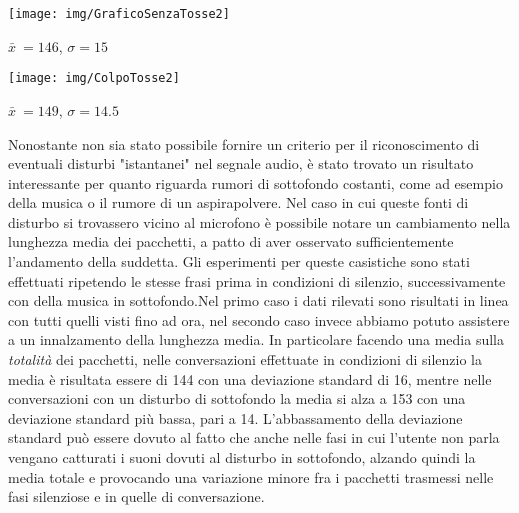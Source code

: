 \begin{minipage}{\linewidth}
\texttt{[image: img/GraficoSenzaTosse2]}
\end{minipage}
\begin{center}
$\bar x\ = 146 $, $\sigma = 15 $
\end{center}


\begin{minipage}{\linewidth}
\texttt{[image: img/ColpoTosse2]}
\end{minipage}
\begin{center}
$\bar x\ = 149 $, $\sigma = 14.5 $
\end{center}

Nonostante non sia stato possibile fornire un criterio per il riconoscimento di eventuali disturbi "istantanei" nel segnale audio, è stato trovato un risultato interessante per quanto riguarda rumori di sottofondo costanti, come ad esempio della musica o il rumore di un aspirapolvere.\newline
Nel caso in cui queste fonti di disturbo si trovassero vicino al microfono è possibile notare un cambiamento nella lunghezza media dei pacchetti, a patto di aver osservato sufficientemente l'andamento della suddetta. Gli esperimenti per queste casistiche sono stati effettuati ripetendo le stesse frasi prima in condizioni di silenzio, successivamente con della musica in sottofondo.\newline Nel primo caso i dati rilevati sono risultati in linea con tutti quelli visti fino ad ora, nel secondo caso invece abbiamo potuto assistere a un innalzamento della lunghezza media. In particolare facendo una media sulla \emph{totalità} dei pacchetti, nelle conversazioni effettuate in condizioni di silenzio la media è risultata essere di 144 con una deviazione standard di 16, mentre nelle conversazioni con un disturbo di sottofondo la media si alza a 153 con una deviazione standard più bassa, pari a 14. L'abbassamento della deviazione standard può essere dovuto al fatto che anche nelle fasi in cui l'utente non parla vengano catturati i suoni dovuti al disturbo in sottofondo, alzando quindi la media totale e provocando una variazione minore fra i pacchetti trasmessi nelle fasi silenziose e in quelle di conversazione.\newline\newline

